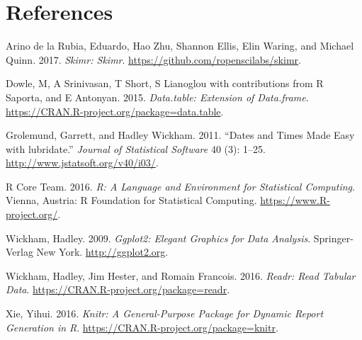 \documentclass[]{article}
\begin{document}
\section*{References}\label{references}

\hypertarget{refs}{}
\hypertarget{ref-skimr}{}
Arino de la Rubia, Eduardo, Hao Zhu, Shannon Ellis, Elin Waring, and
Michael Quinn. 2017. \emph{Skimr: Skimr}.
\url{https://github.com/ropenscilabs/skimr}.

\hypertarget{ref-data.table}{}
Dowle, M, A Srinivasan, T Short, S Lianoglou with contributions from R
Saporta, and E Antonyan. 2015. \emph{Data.table: Extension of
Data.frame}. \url{https://CRAN.R-project.org/package=data.table}.

\hypertarget{ref-lubridate}{}
Grolemund, Garrett, and Hadley Wickham. 2011. ``Dates and Times Made
Easy with lubridate.'' \emph{Journal of Statistical Software} 40 (3):
1--25. \url{http://www.jstatsoft.org/v40/i03/}.

\hypertarget{ref-baseR}{}
R Core Team. 2016. \emph{R: A Language and Environment for Statistical
Computing}. Vienna, Austria: R Foundation for Statistical Computing.
\url{https://www.R-project.org/}.

\hypertarget{ref-ggplot2}{}
Wickham, Hadley. 2009. \emph{Ggplot2: Elegant Graphics for Data
Analysis}. Springer-Verlag New York. \url{http://ggplot2.org}.

\hypertarget{ref-readr}{}
Wickham, Hadley, Jim Hester, and Romain Francois. 2016. \emph{Readr:
Read Tabular Data}. \url{https://CRAN.R-project.org/package=readr}.

\hypertarget{ref-knitr}{}
Xie, Yihui. 2016. \emph{Knitr: A General-Purpose Package for Dynamic
Report Generation in R}. \url{https://CRAN.R-project.org/package=knitr}.
\end{document}
